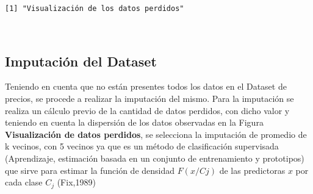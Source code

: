 \documentclass[11pt]{article}
\begin{document}
    
    \begin{Verbatim}[commandchars=\\\{\}]
[1] "Visualización de los datos perdidos"

    \end{Verbatim}

    
    
    \begin{center}
    \end{center}
    { \hspace*{\fill} \\}
    
    \hypertarget{imputaciuxf3n-del-dataset}{%
\subsection{Imputación del Dataset}\label{imputaciuxf3n-del-dataset}}

    Teniendo en cuenta que no están presentes todos los datos en el Dataset
de precios, se procede a realizar la imputación del mismo. Para la
imputación se realiza un cálculo previo de la cantidad de datos
perdidos, con dicho valor y teniendo en cuenta la dispersión de los
datos observadas en la Figura \textbf{Visualización de datos perdidos},
se selecciona la imputación de promedio de k vecinos, con 5 vecinos ya
que es un método de clasificación supervisada (Aprendizaje, estimación
basada en un conjunto de entrenamiento y prototipos) que sirve para
estimar la función de densidad \({F(x/Cj)}\) de las predictoras \({x}\)
por cada clase \({C_{j}}\) (Fix,1989)
\end{document}
